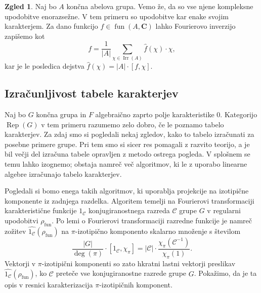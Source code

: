 \documentclass[11pt]{book}
\def\CC{\mathbf{C}}
\def\conclass{\mathcal{C}}
\DeclareMathOperator\Rep{Rep}
\DeclareMathOperator\Irr{Irr}
\DeclareMathOperator\fun{fun}
\theoremstyle{definition}
\theoremstyle{zgled}
\newtheorem*{zgled}{Zgled}
\theoremstyle{odprtproblem}
\theoremstyle{domacanaloga}
\theoremstyle{izrek}
\begin{document}
\begin{zgled}
Naj bo $A$ končna abelova grupa. Vemo že, da so vse njene kompleksne upodobitve enorazsežne. V tem primeru so upodobitve kar enake svojim karakterjem. Za dano funkcijo $f \in \fun(A,\CC)$ lahko Fourierovo inverzijo zapišemo kot
\[
    f = \frac{1}{|A|} \sum_{\chi \in \Irr(A)} \hat{f}(\chi) \cdot \chi,
\]
kar je le posledica dejstva $\hat{f}(\chi) = |A| \cdot [ f, \chi ]$.
\end{zgled}

\subsection{Izračunljivost tabele karakterjev}

Naj bo $G$ končna grupa in $F$ algebraično zaprto polje karakteristike $0$. Kategorijo $\Rep(G)$ v tem primeru razumemo zelo dobro, če le poznamo tabelo karakterjev. Za zdaj smo si pogledali nekaj zgledov, kako to tabelo izračunati za posebne primere grupe. Pri tem smo si sicer res pomagali z razvito teorijo, a je bil večji del izračuna tabele opravljen z metodo ostrega pogleda. V splošnem se temu lahko izognemo; obstaja namreč več algoritmov, ki le z uporabo linearne algebre izračunajo tabelo karakterjev.

Pogledali si bomo enega takih algoritmov, ki uporablja projekcije na izotipične komponente iz zadnjega razdelka. Algoritem temelji na Fourierovi transformaciji karakteristične funkcije $1_{\conclass}$ konjugiranostnega razreda $\conclass$ grupe $G$ v regularni upodobitvi $\rho_{\fun}$. Po lemi o Fourierovi transformaciji razredne funkcije je namreč zožitev $\widehat{1_{\conclass}}(\rho_{\fun})$ na $\pi$-izotipično komponento skalarno množenje s številom
\[
    \frac{|G|}{\deg(\pi)} \cdot [1_{\conclass}, \chi_{\pi}] =
    |\conclass| \cdot \frac{\chi_{\pi}(\conclass^{-1})}{\chi_{\pi}(1)}.
\]
Vektorji v $\pi$-izotipični komponenti so zato hkratni lastni vektorji preslikav $\widehat{1_{\conclass}}(\rho_{\fun})$, ko $\conclass$ preteče vse konjugiranostne razrede grupe $G$. Pokažimo, da je ta opis v resnici karakterizacija $\pi$-izotipičnih komponent.
\end{document}
